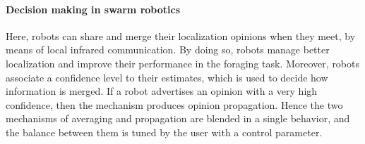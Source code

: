 \documentclass[10pt,a4paper]{article}
\begin{document}
\paragraph{Decision making in swarm robotics}
Here, robots can share and merge their localization opinions when they meet, by means of local infrared communication. By doing so, robots manage better localization and improve their performance in the foraging task. Moreover, robots associate a confidence level to their estimates, which is used to decide how information is merged. If a robot advertises an opinion with a very high confidence, then the mechanism produces opinion propagation. Hence the two mechanisms of averaging and propagation are blended in a single behavior, and the balance between them is tuned by the user with a control parameter.
\end{document}
